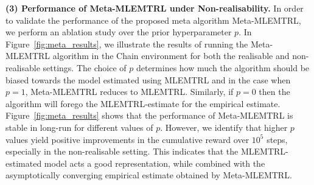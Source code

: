 
\noindent\textbf{(3) Performance of Meta-MLEMTRL under Non-realisability.} In order to validate the performance of the proposed meta algorithm Meta-MLEMTRL, we perform an ablation study over the prior hyperparameter $p$. In Figure~\ref{fig:meta_results}, we illustrate the results of running the Meta-MLEMTRL algorithm in the Chain environment for both the realisable and non-realisable settings. The choice of $p$ determines how much the algorithm should be biased towards the model estimated using MLEMTRL and in the case when $p=1$, Meta-MLEMTRL reduces to MLEMTRL. Similarly, if $p=0$ then the algorithm will forego the MLEMTRL-estimate for the empirical estimate. Figure~\ref{fig:meta_results} shows that the performance of Meta-MLEMTRL is stable in long-run for different values of $p$. %
However, we identify that higher $p$ values yield positive improvements in the cumulative reward over $10^5$ steps, especially in the non-realisable setting. This indicates that the MLEMTRL-estimated model acts a good representation, while combined with the asymptotically converging empirical estimate obtained by Meta-MLEMTRL.%

